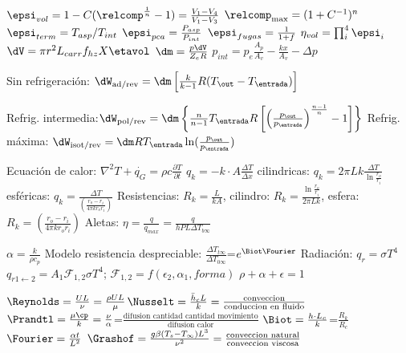 \vspace{\formuleoseparator}
\begin{formuleo}[Alternativos]
$\epsi_{vol}=1-C(\relcomp^{\frac{1}{n}} -1)=\frac{V_1 - V_4}{V_1 - V_3}$ \separar 
$\relcomp_{\max} = (1+C^{-1})^n$ \separar
$\epsi_{term}=T_{asp}/T_{int}$ \separar $\epsi_{pca}=\frac{P_{asp}}{P_{int}}$ \separar $ \epsi_{fugas} = \frac{1}{1+f}$ \separar$ \eta_{vol}=\prod_i^4 \epsi_i$ \separar $\dV = \pi r^2 L_{carr} f_{hz} X \etavol$ \separar $\dm = \frac{p \dV}{Z_e R}$ \separar $p_{int} = p_e \frac{A_p}{A_v}-\frac{kx}{A_v}-\Delta p$
\end{formuleo}
\vspace{\formuleoseparator}
\begin{formuleo}[Refrigeración]
Sin refrigeración: $\dW_{\mathrm{ad/rev}} = \dm \left[\frac{k}{k-1}R(T_{\out}-T_{\entrada}) \right]$ \separar 

Refrig. intermedia:$\dW_{\mathrm{pol/rev}}=\dm \left\{ \frac{n}{n-1} T_{\entrada} R \left[ \left(\frac{p_\out}{p_\entrada}\right)^{\frac{n-1}{n}} -1\right] \right\}$ \separar Refrig. máxima: $\dW_{\mathrm{isot/rev}}=\dm R T_\entrada \ln(\frac{p_\out}{p_\entrada})$
\end{formuleo}
\vspace{\formuleoseparator}
\begin{formuleo}[TdC]
Ecuación de calor: $\nabla^2T+\Dot{q_G}=\rho c \frac{\partial T}{\partial t}$ \separar
$q_k=-k\cdot A\frac{\Delta T}{\Delta x} $ \separar cilindricas: $q_k=2\pi Lk\frac{\Delta T}{\ln{\frac{r_o}{r_i}}}$ \separar esféricas: $q_k=\frac{\Delta T}{\left(\frac{r_o - r_i}{4\pi k r_o r_i}\right)}$ \separar Resistencias: $R_k=\frac{L}{kA}$, cilindro: $R_k=\frac{\ln{\frac{r_o}{r_i}}}{2\pi Lk}$, esfera: $R_k={\left(\frac{r_o - r_i}{4\pi k r_o r_i}\right)}$ \separar Aletas: $\eta=\frac{q}{q_{max}}=\frac{q}{hPL\Delta T_{b\infty}}$ \separar

$\alpha =\frac{k}{\rho c_p}$ \separar Modelo resistencia despreciable: $ \frac{\Delta T_{t\infty}}{\Delta T_{0\infty}}$=$e^{\Biot\Fourier}$ \separar Radiación: $q_r=\sigma T^4$ \separar$q_{r 1\leftarrow 2}=A_1 \mathcal{F}_{1,2} \sigma  T^4$;  $\mathcal{F}_{1,2}=f(\epsilon_2, \alpha_1 ,forma) $ \separar$\rho + \alpha + \epsilon =1$
\end{formuleo}
\vspace{\formuleoseparator}
\begin{formuleo}[Adimensionales]
 $\Reynolds=\frac{UL}{\nu}=\frac{\rho UL}{\mu}$\separar    $\Nusselt=\frac{\Bar{h}_c L}{k}=\frac{\text{conveccion}}{\text{conduccion en fluido}}$ \separar $\Prandtl=\frac{\mu \cp}{k}=\frac{\nu}{\alpha}$=$\frac{\text{difusion\ cantidad\ cantidad\ movimiento}}{\text
 {difusion\ calor}}$ \separar $\Biot=\frac{h\cdot L_c}{k}$=$\frac{R_k}{R_c}$ \separar $\Fourier=\frac{\alpha t}{L^2}$ \separar $\Grashof=\frac{g \beta (T_s-T_\infty)L^3}{\nu ^2}=\frac{\text{conveccion natural}}{\text{conveccion viscosa}}$ 
\end{formuleo}

